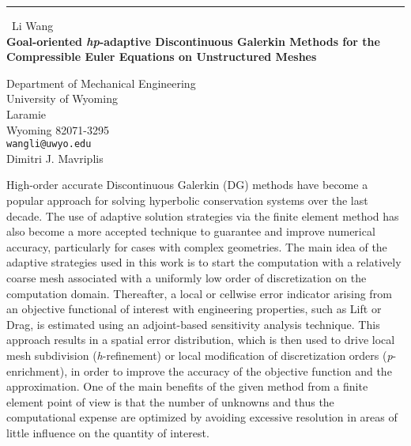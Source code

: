 \documentclass{report}
\begin{document}
\begin{center}
\rule{6in}{1pt} \
{\large Li Wang \\
{\bf Goal-oriented \textit{hp}-adaptive Discontinuous Galerkin Methods for the Compressible Euler Equations on Unstructured Meshes}}

Department of Mechanical Engineering \\ University of Wyoming \\ Laramie \\ Wyoming 82071-3295
\\
{\tt wangli@uwyo.edu}\\
Dimitri J. Mavriplis\end{center}

High-order accurate Discontinuous Galerkin (DG) methods
\cite{Cockburn::98_1,Cockburn::01_1,Nastase::05_1,Wang::07_1}
have become a popular approach for solving hyperbolic conservation
systems over the last decade. The use of adaptive solution strategies via
the finite element method has also become a more accepted technique
to guarantee and improve numerical accuracy, particularly for cases
with complex geometries. The main idea of the adaptive strategies used in
this work is to start the computation with a relatively coarse mesh associated
with a uniformly low order of discretization on the computation domain.
Thereafter, a local or cellwise error indicator arising from an objective
functional of interest with engineering properties, such as Lift or Drag,
is estimated using an adjoint-based sensitivity analysis technique.
This approach results in a spatial error distribution, which is then used
to drive local mesh subdivision (\textit{h}-refinement) or
local modification of discretization orders (\textit{p}-enrichment),
in order to improve the accuracy of the objective function and the approximation.
One of the main benefits of the given method from a finite
element point of view is that the number of unknowns and thus the computational expense
are optimized by avoiding excessive resolution
in areas of little influence on the quantity of interest.
\end{document}
